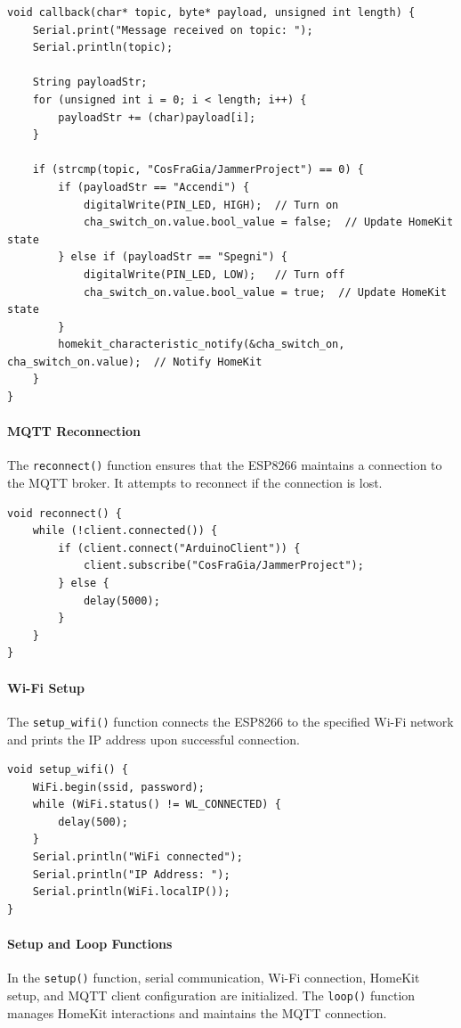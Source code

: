\begin{verbatim}
void callback(char* topic, byte* payload, unsigned int length) {
    Serial.print("Message received on topic: ");
    Serial.println(topic);

    String payloadStr;
    for (unsigned int i = 0; i < length; i++) {
        payloadStr += (char)payload[i];
    }

    if (strcmp(topic, "CosFraGia/JammerProject") == 0) {
        if (payloadStr == "Accendi") {
            digitalWrite(PIN_LED, HIGH);  // Turn on
            cha_switch_on.value.bool_value = false;  // Update HomeKit state
        } else if (payloadStr == "Spegni") {
            digitalWrite(PIN_LED, LOW);   // Turn off
            cha_switch_on.value.bool_value = true;  // Update HomeKit state
        }
        homekit_characteristic_notify(&cha_switch_on, cha_switch_on.value);  // Notify HomeKit
    }
}
\end{verbatim}

\paragraph{MQTT Reconnection}
The \texttt{reconnect()} function ensures that the ESP8266 maintains a connection to the MQTT broker. It attempts to reconnect if the connection is lost.

\begin{verbatim}
void reconnect() {
    while (!client.connected()) {
        if (client.connect("ArduinoClient")) {
            client.subscribe("CosFraGia/JammerProject");
        } else {
            delay(5000);
        }
    }
}
\end{verbatim}

\paragraph{Wi-Fi Setup}
The \texttt{setup\_wifi()} function connects the ESP8266 to the specified Wi-Fi network and prints the IP address upon successful connection.

\begin{verbatim}
void setup_wifi() {
    WiFi.begin(ssid, password);
    while (WiFi.status() != WL_CONNECTED) {
        delay(500);
    }
    Serial.println("WiFi connected");
    Serial.println("IP Address: ");
    Serial.println(WiFi.localIP());
}
\end{verbatim}

\paragraph{Setup and Loop Functions}
In the \texttt{setup()} function, serial communication, Wi-Fi connection, HomeKit setup, and MQTT client configuration are initialized. The \texttt{loop()} function manages HomeKit interactions and maintains the MQTT connection.

